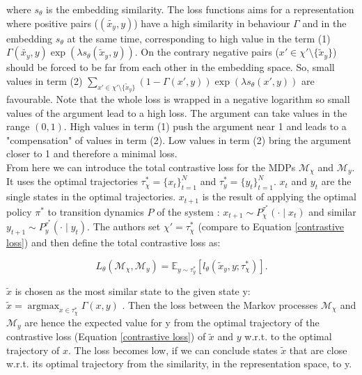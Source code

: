 \documentclass{usiinftr}
\DeclareMathOperator*{\argmax}{argmax}
\begin{document}
where $s_\theta$ is the embedding similarity. The loss functions aims for a representation where positive pairs ($(\tilde{x_y}, y )$) have a high similarity in behaviour $\Gamma$ and in the embedding $s_\theta$ at the same time, corresponding to high value in the term (1) $\Gamma (\tilde{x_y}, y ) \exp(\lambda s_{\theta} (\tilde{x}_y, y))$.
On the contrary negative pairs ($x'\in \chi' \setminus \{\tilde{x}_y \}$) should be forced to be far from each other in the embedding space. So, small values in term (2) $\sum_{x'\in \chi' \setminus \{\tilde{x}_y \}} (1 - \Gamma (x',y)) \exp (\lambda s_{\theta} (x',y))$ are favourable.
Note that the whole loss is wrapped in a negative logarithm so small values of the argument lead to a high loss. The argument can take values in the range $(0,1)$.
High values in term (1) push the argument near 1 and leads to a "compensation" of values in term (2).
Low values in term (2) bring the argument closer to 1 and therefore a minimal loss.
\\
From here we can introduce the total contrastive loss for the MDPs $\mathcal{M}_\chi$ and $\mathcal{M}_y$. It uses the optimal trajectories $\tau_\chi^* = \{x_t\}_{t = 1}^N$ and $\tau_y^* = \{y_t\}_{t = 1}^N$.
$x_t$ and $y_t$ are the single states in the optimal trajectories. $x_{t+1}$ is the result of applying the optimal policy $\pi^*$ to transition dynamics $P$ of the system : $x_{t+1} \sim P_\chi^{\tau^*} (\cdot \mid x_t)$ and similar
$y_{t+1} \sim P_y^{\tau^*} (\cdot \mid y_t)$.
The authors set $\chi' = \tau_\chi^*$ (compare to Equation \ref{contrastive loss}) and then define the total contrastive loss as:

\begin{equation} \label{eq: total_loss}
L_\theta (\mathcal{M}_\chi, \mathcal{M}_y) = \mathbb{E}_{y \sim  \tau_y^*} [l_\theta (\tilde{x}_y, y;\tau_\chi^*)] . 
\end{equation}

$\tilde{x}$ is chosen as the most similar state to the given state y: $\tilde{x} = \argmax_{x \in \tau_\chi ^ *} \Gamma (x,y) $ . Then the loss between the Markov processes $\mathcal{M}_\chi$ and $\mathcal{M}_y$ are hence the expected value for y from the optimal trajectory of the contrastive loss (Equation  \ref{contrastive loss}) of $\tilde{x}$ and $y$ w.r.t. to the optimal trajectory of $x$.  The loss becomes low, if we can conclude states $\tilde{x}$ that are close w.r.t. its optimal trajectory from the similarity, in the representation space, to y. 
\end{document}
